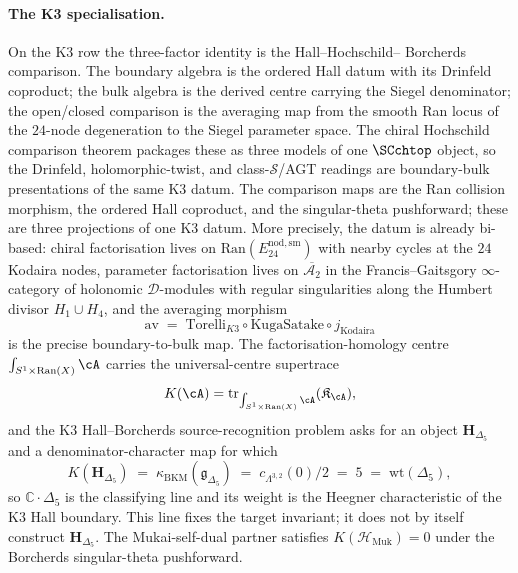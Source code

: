 \paragraph{The K3 specialisation.}
On the K3 row the three-factor identity is the Hall--Hochschild--
Borcherds comparison. The boundary algebra is the
ordered Hall datum with its Drinfeld coproduct; the bulk algebra is
the derived centre carrying the Siegel denominator; the open/closed
comparison is the averaging map from the smooth Ran locus of the
$24$-node degeneration to the Siegel parameter space. The chiral
Hochschild comparison theorem packages these as three models of one
$\SCchtop$ object, so the Drinfeld,
holomorphic-twist, and
class-$\mathcal{S}$/AGT readings
\cite{Drinfeld90,CostelloGaiotto2020,AGT09,SchiffmannVasserot13}
are boundary-bulk presentations of the same K3 datum. The comparison
maps are the Ran collision morphism, the ordered Hall coproduct, and
the singular-theta pushforward; these are three projections of one K3
datum. More precisely, the datum is already bi-based:
chiral factorisation lives on $\mathrm{Ran}(E^{\mathrm{nod,sm}}_{24})$
with nearby cycles at the $24$ Kodaira nodes, parameter
factorisation lives on $\overline{\mathcal{A}_2}$ in the
Francis--Gaitsgory $\infty$-category of holonomic
$\mathcal{D}$-modules with regular singularities along the Humbert
divisor $H_1\cup H_4$, and the averaging morphism
\[
\mathrm{av}
\;=\;
\mathrm{Torelli}_{K3}\circ\mathrm{KugaSatake}\circ j_{\mathrm{Kodaira}}
\]
is the precise boundary-to-bulk map. The factorisation-homology
centre $\int_{S^1\times\mathrm{Ran}(X)}\cA$ carries the
universal-centre supertrace
\[
K(\cA)=\operatorname{tr}_{\int_{S^1\times\mathrm{Ran}(X)}\cA}
(\mathfrak{K}_{\cA}),
\]
and the K3 Hall--Borcherds source-recognition problem asks for an
object $\mathbf{H}_{\Delta_5}$ and a denominator-character map for
which
\[
K(\mathbf{H}_{\Delta_5})
\;=\;
\kappa_{\mathrm{BKM}}(\mathfrak{g}_{\Delta_5})
\;=\;
c_{\Lambda^{3,2}}(0)/2
\;=\;
5
\;=\;
\mathrm{wt}(\Delta_5),
\]
so $\mathbb{C}\cdot\Delta_5$ is the classifying line and its weight
is the Heegner characteristic of the K3 Hall boundary. This line fixes
the target invariant; it does not by itself construct
$\mathbf{H}_{\Delta_5}$. The Mukai-self-dual partner satisfies
$K(\mathcal{H}_{\mathrm{Muk}})=0$ under the Borcherds
singular-theta pushforward.

